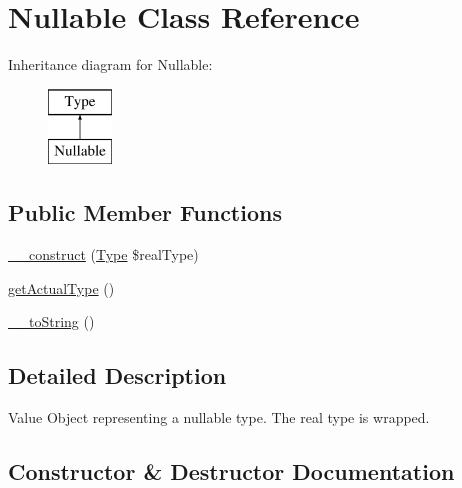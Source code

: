 \hypertarget{classphp_documentor_1_1_reflection_1_1_types_1_1_nullable}{}\section{Nullable Class Reference}
\label{classphp_documentor_1_1_reflection_1_1_types_1_1_nullable}
Inheritance diagram for Nullable\+:\begin{figure}[H]
\begin{center}
\leavevmode
\includegraphics[height=2.000000cm]{classphp_documentor_1_1_reflection_1_1_types_1_1_nullable}
\end{center}
\end{figure}
\subsection*{Public Member Functions}
\begin{DoxyCompactItemize}
\item 
\mbox{\hyperlink{classphp_documentor_1_1_reflection_1_1_types_1_1_nullable_a377849276f2c7d6c6a11804cc48e8911}{\+\_\+\+\_\+construct}} (\mbox{\hyperlink{interfacephp_documentor_1_1_reflection_1_1_type}{Type}} \$real\+Type)
\item 
\mbox{\hyperlink{classphp_documentor_1_1_reflection_1_1_types_1_1_nullable_aa527e33318eb1d11f78d387f5d888e36}{get\+Actual\+Type}} ()
\item 
\mbox{\hyperlink{classphp_documentor_1_1_reflection_1_1_types_1_1_nullable_a7516ca30af0db3cdbf9a7739b48ce91d}{\+\_\+\+\_\+to\+String}} ()
\end{DoxyCompactItemize}


\subsection{Detailed Description}
Value Object representing a nullable type. The real type is wrapped. 

\subsection{Constructor \& Destructor Documentation}
\mbox{\label{classphp_documentor_1_1_reflection_1_1_types_1_1_nullable_a377849276f2c7d6c6a11804cc48e8911}} 
